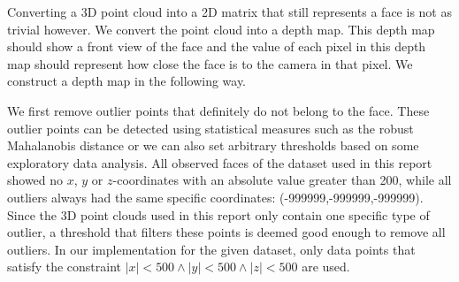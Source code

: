 \documentclass[]{article}
\begin{document}
Converting a 3D point cloud into a 2D matrix that still represents a face is not as trivial however. We convert the point cloud into a depth map. This depth map should show a front view of the face and the value of each pixel in this depth map should represent how close the face is to the camera in that pixel. We construct a depth map in the following way.

We first remove outlier points that definitely do not belong to the face. These outlier points can be detected using statistical measures such as the robust Mahalanobis distance or we can also set arbitrary thresholds based on some exploratory data analysis. All observed faces of the dataset used in this report showed no $x$, $y$ or $z$-coordinates with an absolute value greater than 200, while all outliers always had the same specific coordinates: (-999999,-999999,-999999). Since the 3D point clouds used in this report only contain one specific type of outlier, a threshold that filters these points is deemed good enough to remove all outliers. In our implementation for the given dataset, only data points that satisfy the constraint $|x|<500 \wedge |y| < 500 \wedge |z| < 500$ are used.
\end{document}
